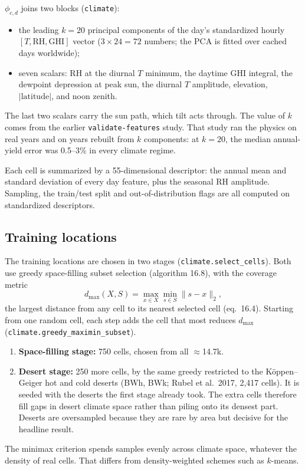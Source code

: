 \documentclass[11pt]{article}
\newcommand{\code}[1]{\texttt{#1}}
\begin{document}
$\phi_{c,d}$ joins two blocks (\code{climate}):
\begin{itemize}
\item the leading $k = 20$ principal components of the day's standardized hourly
$[T, \mathrm{RH}, \mathrm{GHI}]$ vector ($3\times24 = 72$ numbers; the PCA is fitted over
cached days worldwide);
\item seven scalars: RH at the diurnal $T$ minimum, the daytime GHI integral, the dewpoint
depression at peak sun, the diurnal $T$ amplitude, elevation, $|\text{latitude}|$, and noon
zenith.
\end{itemize}
The last two scalars carry the sun path, which tilt acts through. The value of $k$ comes from
the earlier \code{validate-features} study. That study ran the physics on real years and on
years rebuilt from $k$ components: at $k = 20$, the median annual-yield error was 0.5--3\%
in every climate regime.

Each cell is summarized by a 55-dimensional descriptor: the annual mean and standard
deviation of every day feature, plus the seasonal RH amplitude. Sampling, the train/test
split and out-of-distribution flags are all computed on standardized descriptors.

\subsection{Training locations}

The training locations are chosen in two stages (\code{climate.select\_cells}). Both use
greedy space-filling subset selection (algorithm 16.8), with the coverage metric
\begin{equation}
d_{\max}(X, S) = \max_{x \in X} \min_{s \in S} \lVert s - x \rVert_2 ,
\end{equation}
the largest distance from any cell to its nearest selected cell (eq.~16.4). Starting from one
random cell, each step adds the cell that most reduces $d_{\max}$
(\code{climate.greedy\_maximin\_subset}).
\begin{enumerate}
\item \textbf{Space-filling stage:} 750 cells, chosen from all $\approx$14.7k.
\item \textbf{Desert stage:} 250 more cells, by the same greedy restricted to the
K\"oppen--Geiger hot and cold deserts (BWh, BWk; Rubel et al.\ 2017, 2,417 cells). It is
seeded with the deserts the first stage already took. The extra cells therefore fill gaps in
desert climate space rather than piling onto its densest part. Deserts are oversampled because
they are rare by area but decisive for the headline result.
\end{enumerate}
The minimax criterion spends samples evenly across climate space, whatever the density of
real cells. That differs from density-weighted schemes such as $k$-means.
\end{document}
